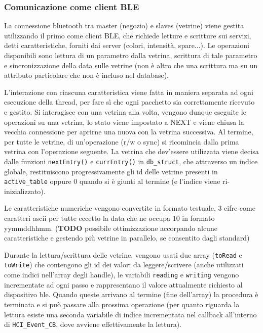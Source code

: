 \subsubsection{Comunicazione come client BLE}


La connessione bluetooth tra master (negozio) e slaves (vetrine) viene gestita utilizzando il primo come client BLE, che richiede letture e scritture sui servizi, detti caratteristiche, forniti dai server (colori, intensit\`a, spare...). Le operazioni disponibili sono lettura di un parametro dalla vetrina, scrittura di tale parametro e sincronizzazione della data sulle vetrine (non \`e altro che una scrittura ma su un attributo particolare che non \`e incluso nel database). 

L'interazione con ciascuna caratteristica viene fatta in maniera separata ad ogni esecuzione della thread, per fare s\`i che ogni pacchetto sia correttamente ricevuto e gestito. Si interagisce con una vetrina alla volta, vengono dunque eseguite le operazioni su una vetrina, lo stato viene impostato a NEXT e viene chiusa la vecchia connessione per aprirne una nuova con la vetrina successiva. Al termine, per tutte le vetrine, di un'operazione (r/w o sync) si ricomincia dalla prima vetrina con l'operazione seguente. La vetrina che dev'essere utilizzata viene decisa dalle funzioni \texttt{nextEntry()} e \texttt{currEntry()} in \texttt{db\_struct}, che attraverso un indice globale, restituiscono progressivamente gli id delle vetrine presenti in \texttt{active\_table} oppure 0 quando si \`e giunti al termine (e l'indice viene ri-inizializzato).

Le caratteristiche numeriche vengono convertite in formato testuale, 3 cifre come caratteri ascii per tutte eccetto la data che ne occupa 10 in formato yymmddhhmm. (\textbf{TODO} possibile ottimizzazione accorpando alcune caratteristiche e gestendo pi\`u vetrine in parallelo, se consentito dagli standard)

Durante la lettura/scrittura delle vetrine, vengono usati due array (\texttt{toRead} e \texttt{toWrite}) che contengono gli id dei valori da leggere/scrivere (anche utilizzati come indici nell'array degli handle), le variabili \texttt{reading} e \texttt{writing} vengono incrementate ad ogni passo e rappresentano il valore attualmente richiesto al dispositivo ble. Quando queste arrivano al termine (fine dell'array) la procedura \`e terminata e si pu\`o passare alla prossima operazione (per quanto riguarda la lettura esiste una seconda variabile di indice incrementata nel callback all'interno di \texttt{HCI\_Event\_CB}, dove avviene effettivamente la lettura).

